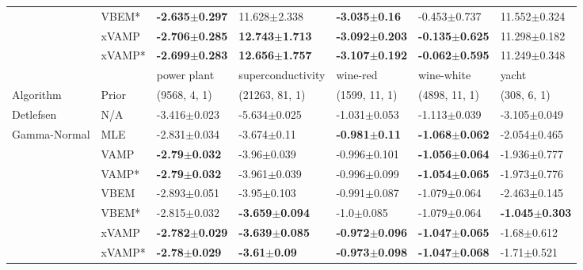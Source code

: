 \begin{tabular}{lllllll}
                 & VBEM* &  \textbf{-2.635$\pm$0.297} &           11.628$\pm$2.338 &   \textbf{-3.035$\pm$0.16} &           -0.453$\pm$0.737 &           11.552$\pm$0.324 \\
                 & xVAMP &  \textbf{-2.706$\pm$0.285} &  \textbf{12.743$\pm$1.713} &  \textbf{-3.092$\pm$0.203} &  \textbf{-0.135$\pm$0.625} &           11.298$\pm$0.182 \\
                 & xVAMP* &  \textbf{-2.699$\pm$0.283} &  \textbf{12.656$\pm$1.757} &  \textbf{-3.107$\pm$0.192} &  \textbf{-0.062$\pm$0.595} &           11.249$\pm$0.348 \\
\midrule
                 &        &                power plant &          superconductivity &                   wine-red &                 wine-white &                      yacht \\
Algorithm & Prior& (9568, 4, 1)& (21263, 81, 1)& (1599, 11, 1)& (4898, 11, 1)& (308, 6, 1)\\
\midrule
Detlefsen & N/A &           -3.416$\pm$0.023 &           -5.634$\pm$0.025 &           -1.031$\pm$0.053 &           -1.113$\pm$0.039 &           -3.105$\pm$0.049 \\
Gamma-Normal & MLE &           -2.831$\pm$0.034 &            -3.674$\pm$0.11 &   \textbf{-0.981$\pm$0.11} &  \textbf{-1.068$\pm$0.062} &           -2.054$\pm$0.465 \\
                 & VAMP &   \textbf{-2.79$\pm$0.032} &            -3.96$\pm$0.039 &           -0.996$\pm$0.101 &  \textbf{-1.056$\pm$0.064} &           -1.936$\pm$0.777 \\
                 & VAMP* &   \textbf{-2.79$\pm$0.032} &           -3.961$\pm$0.039 &           -0.996$\pm$0.099 &  \textbf{-1.054$\pm$0.065} &           -1.973$\pm$0.776 \\
                 & VBEM &           -2.893$\pm$0.051 &            -3.95$\pm$0.103 &           -0.991$\pm$0.087 &           -1.079$\pm$0.064 &           -2.463$\pm$0.145 \\
                 & VBEM* &           -2.815$\pm$0.032 &  \textbf{-3.659$\pm$0.094} &             -1.0$\pm$0.085 &           -1.079$\pm$0.064 &  \textbf{-1.045$\pm$0.303} \\
                 & xVAMP &  \textbf{-2.782$\pm$0.029} &  \textbf{-3.639$\pm$0.085} &  \textbf{-0.972$\pm$0.096} &  \textbf{-1.047$\pm$0.065} &            -1.68$\pm$0.612 \\
                 & xVAMP* &   \textbf{-2.78$\pm$0.029} &    \textbf{-3.61$\pm$0.09} &  \textbf{-0.973$\pm$0.098} &  \textbf{-1.047$\pm$0.068} &            -1.71$\pm$0.521 \\

\end{tabular}
